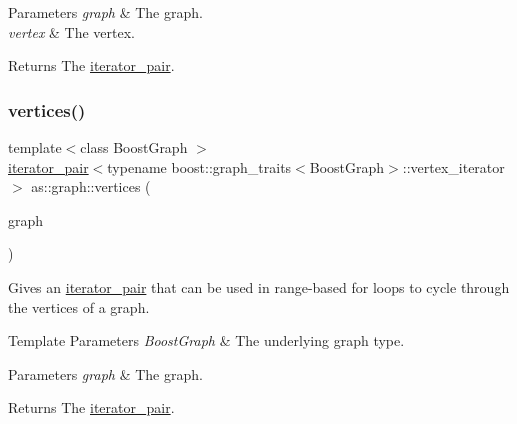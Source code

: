 \begin{DoxyParams}{Parameters}
{\em graph} & The graph. \\
\hline
{\em vertex} & The vertex. \\
\hline
\end{DoxyParams}
\begin{DoxyReturn}{Returns}
The \hyperlink{classas_1_1iterator__pair}{iterator\+\_\+pair}. 
\end{DoxyReturn}
\mbox{\label{namespaceas_1_1graph_ab93ee208eb116d3a3349c8de8cc91445}} 
\subsubsection{\texorpdfstring{vertices()}{vertices()}}
{\footnotesize\ttfamily template$<$class Boost\+Graph $>$ \\
\hyperlink{classas_1_1iterator__pair}{iterator\+\_\+pair}$<$typename boost\+::graph\+\_\+traits$<$Boost\+Graph$>$\+::vertex\+\_\+iterator$>$ as\+::graph\+::vertices (\begin{DoxyParamCaption}\item[{const Boost\+Graph \&}]{graph }\end{DoxyParamCaption})\hspace{0.3cm}{\ttfamily [inline]}}



Gives an \hyperlink{classas_1_1iterator__pair}{iterator\+\_\+pair} that can be used in range-\/based for loops to cycle through the vertices of a graph. 


\begin{DoxyTemplParams}{Template Parameters}
{\em Boost\+Graph} & The underlying graph type. \\
\hline
\end{DoxyTemplParams}

\begin{DoxyParams}{Parameters}
{\em graph} & The graph. \\
\hline
\end{DoxyParams}
\begin{DoxyReturn}{Returns}
The \hyperlink{classas_1_1iterator__pair}{iterator\+\_\+pair}. 
\end{DoxyReturn}
